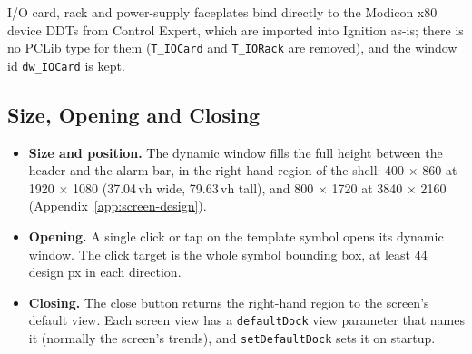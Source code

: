 I/O card, rack and power-supply faceplates bind directly to the Modicon x80 device DDTs from Control Expert, which are imported into Ignition as-is; there is no PCLib type for them (\texttt{T\_IOCard} and \texttt{T\_IORack} are removed), and the window id \texttt{dw\_IOCard} is kept.

\subsection[Size, Opening and Closing]{Size, Opening and Closing \newmark}\label{sec:hmi-dw-open}
\begin{itemize}[itemsep=1pt]
  \item \textbf{Size and position.} The dynamic window fills the full height between the header and the alarm bar, in the right-hand region of the shell: 400 $\times$ 860 at 1920 $\times$ 1080 (37.04\,vh wide, 79.63\,vh tall), and 800 $\times$ 1720 at 3840 $\times$ 2160 (Appendix~\ref{app:screen-design}).
  \item \textbf{Opening.} A single click or tap on the template symbol opens its dynamic window. The click target is the whole symbol bounding box, at least 44 design px in each direction.
  \item \textbf{Closing.} The close button returns the right-hand region to the screen's default view. Each screen view has a \texttt{defaultDock} view parameter that names it (normally the screen's trends), and \texttt{setDefaultDock} sets it on startup.
\end{itemize}

